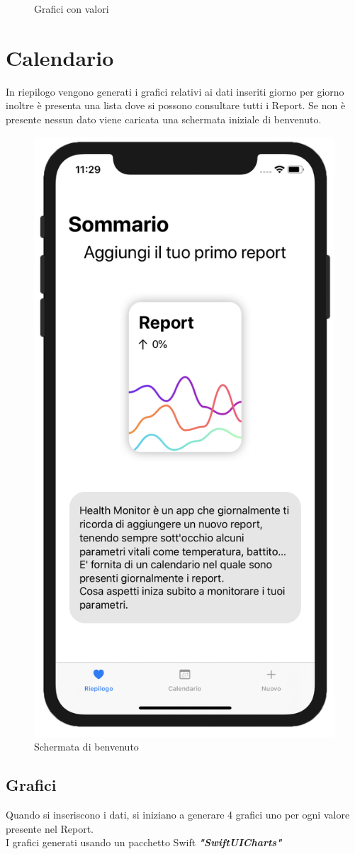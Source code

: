 \documentclass{article}
\begin{document}
\begin{figure}[htp]
\caption{Grafici con valori}
\label{fig:figure3}

\end{figure}


\newpage
\section{Calendario}

In riepilogo vengono generati i grafici relativi ai dati inseriti giorno per giorno inoltre è presenta una lista dove si possono consultare tutti i Report. Se non è presente nessun dato viene caricata una schermata iniziale di benvenuto. 

\begin{figure}[htp]

\centering
\includegraphics[width=.3\textwidth]{img/riepilogo_iniziale.png}

\caption{Schermata di benvenuto}
\label{fig:figure3}
\end{figure}

\subsection{Grafici}

Quando si inseriscono i dati, si iniziano a generare 4 grafici uno per ogni valore presente nel Report.\\
I grafici generati usando un pacchetto Swift \textbf{\textit{"SwiftUICharts"}}


\end{document}
